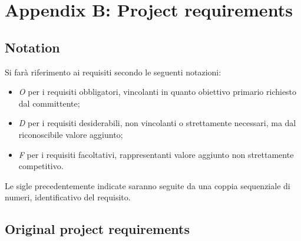 \renewcommand\thechapter{B}
\chapter{Appendix B: Project requirements}
\label{AppendixB}

\section{Notation}
Si farà riferimento ai requisiti secondo le seguenti notazioni:
\begin{itemize}
	\item \textit{O} per i requisiti obbligatori, vincolanti in quanto obiettivo primario richiesto dal committente;
	\item \textit{D} per i requisiti desiderabili, non vincolanti o strettamente necessari,
	ma dal riconoscibile valore aggiunto;
	\item \textit{F} per i requisiti facoltativi, rappresentanti valore aggiunto non strettamente 
	competitivo.
\end{itemize}

Le sigle precedentemente indicate saranno seguite da una coppia sequenziale di numeri, identificativo del requisito.

\section{Original project requirements}

